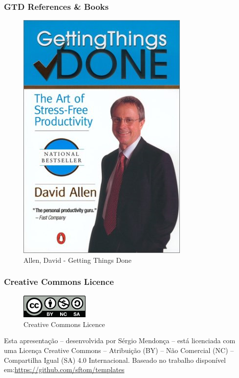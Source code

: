 \documentclass{beamer}
\begin{document}
\begin{frame}[t]\frametitle{GTD References \& Books}
    
\begin{figure}[tb]
	\begin{center}
		\includegraphics[width=0.38\linewidth]{img/gtd-book.png}
	\end{center}
	\caption{Allen, David - Getting Things Done}
	\label{fig:figure1}
\end{figure}

\end{frame}

 \begin{frame}[c]\frametitle{Creative Commons Licence}
     \begin{figure}[ht]
          \centering
          \caption{\label{fig:by-nc-sa} Creative Commons Licence}
          \includegraphics[width=0.3\textwidth]{./img/by-nc-sa.jpg}
      \end{figure} 
      Esta apresentação -- desenvolvida por Sérgio Mendonça -- está licenciada com uma Licença Creative Commons -- Atribuição (BY) -- Não Comercial (NC) -- Compartilha Igual (SA) 4.0 Internacional. Baseado no trabalho disponível em:\newline \url{https://github.com/sftom/templates}
 \end{frame}
\end{document}
